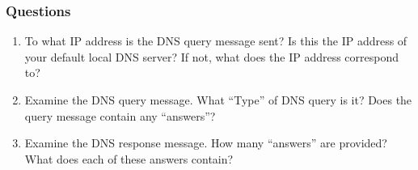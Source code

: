     \subsubsection*{Questions}
        \begin{enumerate}[label=\bfseries Problem \arabic*:,leftmargin=*,labelindent=1em]
        \addtocounter{enumi}{14}
            \item To what IP address is the DNS query message sent? 
            Is this the IP address of your default local DNS server? 
            If not, what does the IP address correspond to?\\[0.2mm]
            \soln
            
            \item Examine the DNS query message. 
            What “Type” of DNS query is it? Does the query message contain any “answers”?\\[0.2mm]
            \soln
            
            \item Examine the DNS response message. How many “answers” are provided?
            What does each of these answers contain?\\[0.2mm]
            \soln
            
        \end{enumerate}